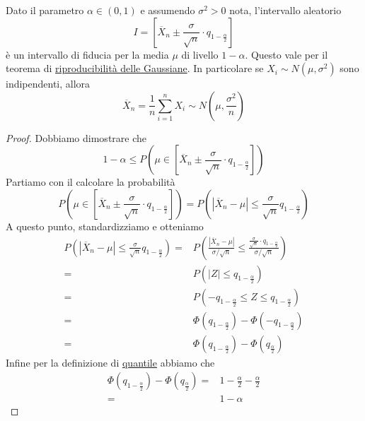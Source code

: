 \begin{proposition}
	Dato il parametro $\alpha \in (0,1)$ e assumendo $\sigma^2 > 0$ nota, l'intervallo aleatorio
	\[
		I = \left[ \overline{X}_n \pm \frac{\sigma}{\sqrt{n}}
			\cdot q_{1 - \frac{\alpha}{2}} \right]
	\]
	è un intervallo di fiducia per la media $\mu$ di livello $1 - \alpha$. Questo vale per il
	teorema di \hyperref[prop: riprod_gauss]{riproducibilità delle Gaussiane}. In particolare se
	$X_i \sim N(\mu, \sigma^2)$ sono indipendenti, allora
	\[
		\overline{X}_n = \frac{1}{n} \sum_{i=1}^n X_i \sim
		N \left( \mu, \frac{\sigma^2}{n} \right)
	\]
	\begin{proof}
		Dobbiamo dimostrare che
		\[
			1 - \alpha \leq P \left( \mu \in \left[ \overline{X}_n \pm
				\frac{\sigma}{\sqrt{n}} \cdot q_{1-\frac{\alpha}{2}} \right] \right)
		\]
		Partiamo con il calcolare la probabilità
		\[
			P \left( \mu \in \left[ \overline{X}_n \pm
				\frac{\sigma}{\sqrt{n}} \cdot q_{1-\frac{\alpha}{2}} \right] \right) =
			P \left( \left| \overline{X}_n - \mu \right| \leq
			\frac{\sigma}{\sqrt{n}} q_{1 - \frac{\alpha}{2}} \right)
		\]
		A questo punto, standardizziamo e otteniamo
		\begin{align*}
			P \left( |\overline{X}_n - \mu| \leq
			\frac{\sigma}{\sqrt{n}} q_{1 - \frac{\alpha}{2}} \right) = &
			P \left( \frac{|\overline{X}_n - \mu|}{\sigma / \sqrt{n}} \leq
			\frac{\frac{\sigma}{\sqrt{n}} \cdot q_{1-\frac{\alpha}{2}}}{\sigma/\sqrt{n}} \right) \\
			=                                                          &
			P \left( |Z| \leq q_{1 - \frac{\alpha}{2}} \right)                                   \\
			=                                                          &
			P \left( -q_{1 - \frac{\alpha}{2}} \leq Z \leq q_{1-\frac{\alpha}{2}} \right)        \\
			=                                                          &
			\Phi \left( q_{1-\frac{\alpha}{2}} \right) -
			\Phi \left(-q_{1-\frac{\alpha}{2}} \right)                                           \\
			=                                                          &
			\Phi \left( q_{1-\frac{\alpha}{2}} \right) -
			\Phi \left(q_{\frac{\alpha}{2}} \right)
		\end{align*}
		Infine per la definizione di \hyperref[def: quantile]{quantile} abbiamo che
		\begin{align*}
			\Phi \left( q_{1-\frac{\alpha}{2}} \right) -
			\Phi \left(q_{\frac{\alpha}{2}} \right) = & 1 - \frac{\alpha}{2} -
			\frac{\alpha}{2}                                                   \\
			=                                         & 1 - \alpha
		\end{align*}
	\end{proof}
\end{proposition}

